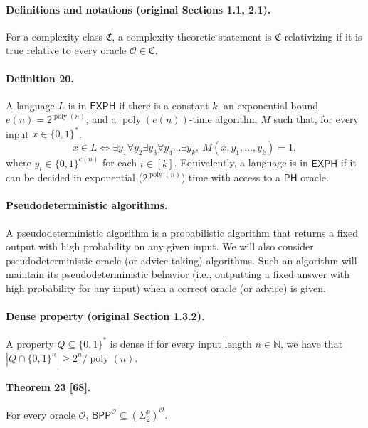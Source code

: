 \paragraph{Definitions and notations (original Sections 1.1, 2.1).}
For a complexity class $\mathfrak C$, a complexity-theoretic statement is $\mathfrak C$-relativizing if it is true relative to every oracle $\mathcal O\in\mathfrak C$.
\paragraph{Definition 20.} A language $L$ is in $\mathsf{EXPH}$ if there is a constant $k$, an exponential bound $e(n)=2^{\operatorname{poly}(n)}$, and a $\operatorname{poly}(e(n))$-time algorithm $M$ such that, for every input $x\in\{0,1\}^*$,
\[x\in L\Longleftrightarrow\exists y_1\forall y_2\exists y_3\forall y_4\ldots\exists y_k,\ M(x,y_1,\ldots,y_k)=1,\]
where $y_i\in\{0,1\}^{e(n)}$ for each $i\in[k]$. Equivalently, a language is in $\mathsf{EXPH}$ if it can be decided in exponential ($2^{\operatorname{poly}(n)}$) time with access to a $\mathsf{PH}$ oracle.
\paragraph{Pseudodeterministic algorithms.} A pseudodeterministic algorithm is a probabilistic algorithm that returns a fixed output with high probability on any given input. We will also consider pseudodeterministic oracle (or advice-taking) algorithms. Such an algorithm will maintain its pseudodeterministic behavior (i.e., outputting a fixed answer with high probability for any input) when a correct oracle (or advice) is given.
\paragraph{Dense property (original Section 1.3.2).} A property $Q\subseteq\{0,1\}^*$ is dense if for every input length $n\in\mathbb N$, we have that $|Q\cap\{0,1\}^n|\geq2^n/\operatorname{poly}(n)$.
\paragraph{Theorem 23 [68].} For every oracle $\mathcal O$, $\mathsf{BPP}^{\mathcal O}\subseteq(\Sigma^p_2)^{\mathcal O}$.
